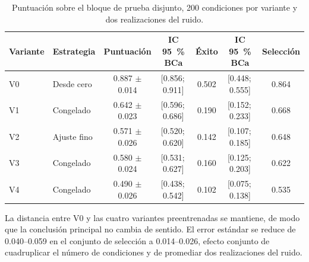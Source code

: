 \begin{table}[htbp]
  \centering
  \caption{Puntuaci\'on sobre el bloque de prueba disjunto, \num{200} condiciones por
    variante y dos realizaciones del ruido.}
  \label{tab:prueba-final}
  \small
  \scriptsize
  \begin{tabular}{llcccc c}
    \toprule
    Variante & Estrategia & Puntuaci\'on & IC \SI{95}{\percent} BCa & \'Exito &
      IC \SI{95}{\percent} BCa & Selecci\'on \\
    \midrule
    V0 & Desde cero  & \num{0.887} $\pm$ \num{0.014} &
      {[\num{0.856};\,\num{0.911}]} & \num{0.502} &
      {[\num{0.448};\,\num{0.555}]} & \num{0.864} \\
    V1 & Congelado   & \num{0.642} $\pm$ \num{0.023} &
      {[\num{0.596};\,\num{0.686}]} & \num{0.190} &
      {[\num{0.152};\,\num{0.233}]} & \num{0.668} \\
    V2 & Ajuste fino & \num{0.571} $\pm$ \num{0.026} &
      {[\num{0.520};\,\num{0.620}]} & \num{0.142} &
      {[\num{0.107};\,\num{0.185}]} & \num{0.648} \\
    V3 & Congelado   & \num{0.580} $\pm$ \num{0.024} &
      {[\num{0.531};\,\num{0.627}]} & \num{0.160} &
      {[\num{0.125};\,\num{0.203}]} & \num{0.622} \\
    V4 & Congelado   & \num{0.490} $\pm$ \num{0.026} &
      {[\num{0.438};\,\num{0.542}]} & \num{0.102} &
      {[\num{0.075};\,\num{0.138}]} & \num{0.535} \\
    \bottomrule
  \end{tabular}
\end{table}

La distancia entre V0 y las cuatro variantes preentrenadas se mantiene, de modo que la
conclusi\'on principal no cambia de sentido. El error est\'andar se reduce de
\num{0.040}--\num{0.059} en el conjunto de selecci\'on a \num{0.014}--\num{0.026}, efecto
conjunto de cuadruplicar el n\'umero de condiciones y de promediar dos realizaciones del
ruido.


